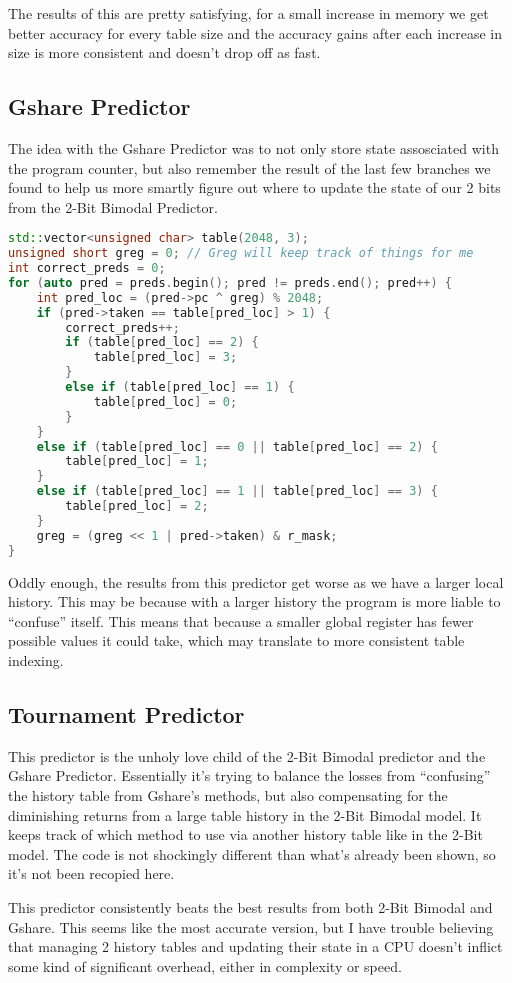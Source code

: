 \documentclass[12pt]{article}
\begin{document}
The results of this are pretty satisfying, for a small increase in memory we get
better accuracy for every table size and the accuracy gains after each increase
in size is more consistent and doesn't drop off as fast.

\subsection{Gshare Predictor}
\label{subsec:label}

The idea with the Gshare Predictor was to not only store state assosciated with
the program counter, but also remember the result of the last few branches we
found to help us more smartly figure out where to update the state of our 2 bits
from the 2-Bit Bimodal Predictor.

\begin{lstlisting}[language=C++, caption=Thanks Greg]
std::vector<unsigned char> table(2048, 3);
unsigned short greg = 0; // Greg will keep track of things for me
int correct_preds = 0;
for (auto pred = preds.begin(); pred != preds.end(); pred++) {
    int pred_loc = (pred->pc ^ greg) % 2048;
    if (pred->taken == table[pred_loc] > 1) {
        correct_preds++;
        if (table[pred_loc] == 2) {
            table[pred_loc] = 3;
        }
        else if (table[pred_loc] == 1) {
            table[pred_loc] = 0;
        }
    }
    else if (table[pred_loc] == 0 || table[pred_loc] == 2) {
        table[pred_loc] = 1;
    }
    else if (table[pred_loc] == 1 || table[pred_loc] == 3) {
        table[pred_loc] = 2;
    }
    greg = (greg << 1 | pred->taken) & r_mask;
}
\end{lstlisting}

Oddly enough, the results from this predictor get worse as we have a larger
local history. This may be because with a larger history the program is more
liable to ``confuse'' itself. This means that because a smaller global register
has fewer possible values it could take, which may translate to more consistent
table indexing.

\subsection{Tournament Predictor}
\label{subsec:label}
 
This predictor is the unholy love child of the 2-Bit Bimodal predictor and the
Gshare Predictor. Essentially it's trying to balance the losses from
``confusing'' the history table from Gshare's methods, but also compensating for
the diminishing returns from a large table history in the 2-Bit Bimodal model.
It keeps track of which method to use via another history table like in the
2-Bit model. The code is not shockingly different than what's already been
shown, so it's not been recopied here.

This predictor consistently beats the best results from both 2-Bit Bimodal and
Gshare. This seems like the most accurate version, but I have trouble believing
that managing 2 history tables and updating their state in a CPU doesn't inflict some
kind of significant overhead, either in complexity or speed.
\end{document}
